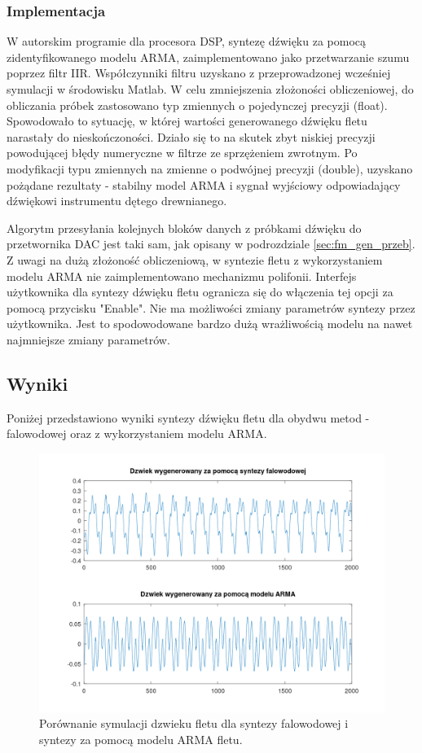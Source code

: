 \subsubsection{Implementacja}
W autorskim programie dla procesora DSP, syntezę dźwięku za pomocą zidentyfikowanego modelu ARMA, zaimplementowano jako przetwarzanie szumu poprzez filtr IIR. Współczynniki filtru uzyskano z przeprowadzonej wcześniej symulacji w środowisku Matlab. 
W celu zmniejszenia złożoności obliczeniowej, do obliczania próbek zastosowano typ zmiennych o pojedynczej precyzji (float). Spowodowało to sytuację, w której wartości generowanego dźwięku fletu narastały do nieskończoności. Działo się to na skutek zbyt niskiej precyzji powodującej błędy numeryczne w filtrze ze sprzężeniem zwrotnym. Po modyfikacji typu zmiennych na zmienne o podwójnej precyzji (double), uzyskano pożądane rezultaty - stabilny model ARMA i sygnał wyjściowy odpowiadający dźwiękowi instrumentu dętego drewnianego.


Algorytm przesyłania kolejnych bloków danych z próbkami dźwięku do przetwornika DAC jest taki sam, jak opisany w podrozdziale \ref{sec:fm_gen_przeb}. Z uwagi na dużą złożoność obliczeniową, w syntezie fletu z wykorzystaniem modelu ARMA nie zaimplementowano mechanizmu polifonii.
Interfejs użytkownika dla syntezy dźwięku fletu ogranicza się do włączenia tej opcji za pomocą przycisku "Enable". Nie ma możliwości zmiany parametrów syntezy przez użytkownika. Jest to spodowodowane bardzo dużą wrażliwością modelu na nawet najmniejsze zmiany parametrów.

\subsection{Wyniki}
Poniżej przedstawiono wyniki syntezy dźwięku fletu dla obydwu metod - falowodowej oraz z wykorzystaniem modelu ARMA.

\begin{figure}[H]
	\centering
	\includegraphics[width=12cm]{grafiki/flute_porownanie_syntez_symulacja}
	\captionsetup{justification=centering}
	\caption{Porównanie symulacji dzwieku fletu dla syntezy falowodowej i syntezy za pomocą modelu ARMA fletu.}
	\label{rys:por_synt_flet}
\end{figure}

